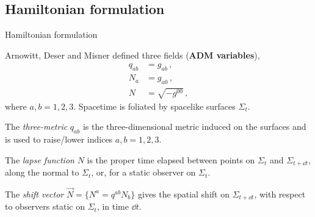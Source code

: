 \documentclass{beamer}
\newcommand\boldtext[1]{\textcolor{bolds}{\textbf{#1}}}
\newcommand\italictext[1]{\textcolor{italics}{\textit{#1}}}
\begin{document}
\subsection{Hamiltonian formulation}

\begin{frame}{Hamiltonian formulation}
    \begin{list}{\maltese}{\leftmargin=1em \itemindent=0em}
        \item<1-> Arnowitt, Deser and Misner defined three fields (\boldtext{ADM variables}),
        \begin{align}
            q_{ab}&=g_{ab}\,,\\
            N_a&=g_{a0}\,,\\
            N&=\sqrt{-g^{00}}\,,
        \end{align}
        where $a,b=1,2,3$. Spacetime is foliated by spacelike surfaces $\Sigma_t$. 
        \item<2-> The \italictext{three-metric} $q_{ab}$ is the three-dimensional metric induced on the surfaces and is used to raise/lower indices $a,b=1,2,3$.
        \item<3-> The \italictext{lapse function} $N$ is the proper time elapsed between points on $\Sigma_t$ and $\Sigma_{t+\dd{t}}$, along the normal to $\Sigma_t$, or, for a static observer on $\Sigma_t$.
        \item<4-> The \italictext{shift vector} $\vec{N}=\{N^a=q^{ab}N_b\}$ gives the spatial shift on $\Sigma_{t+\dd{t}}$, with respect to observers static on $\Sigma_t$, in time $\dd{t}$.
    \end{list}
\end{frame}
\end{document}
